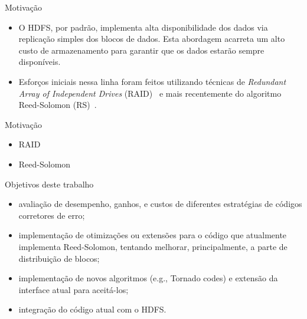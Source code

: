   \begin{frame}{Motivação}
     \begin{itemize}
      \item O HDFS, por padrão, implementa alta disponibilidade dos dados via replicação simples dos blocos de dados. Esta abordagem acarreta um alto custo de armazenamento para garantir que os dados estarão sempre disponíveis.
      \item Esforços iniciais nessa linha foram feitos utilizando técnicas de \emph{Redundant Array of Independent Drives} (RAID)~\cite{HDFS-503:2010,Patterson:1988} e mais recentemente do algoritmo Reed-Solomon (RS)~\cite{MR-1969:2010}.
     \end{itemize}
  \end{frame}

  \begin{frame}{Motivação}
     \begin{itemize}
        \item RAID
        \item Reed-Solomon
     \end{itemize}
  \end{frame}

  \begin{frame}{Objetivos deste trabalho}

  \begin{itemize}
     \item avaliação de desempenho, ganhos, e custos de diferentes
  estratégias de códigos corretores de erro;
     \item implementação de otimizações ou extensões para o código que
  atualmente implementa Reed-Solomon, tentando melhorar,
  principalmente, a parte de distribuição de blocos;
     \item implementação de novos algoritmos (e.g., Tornado codes) e
  extensão da interface atual para aceitá-los;
     \item integração do código atual com o HDFS.
     \end{itemize}
  \end{frame}
